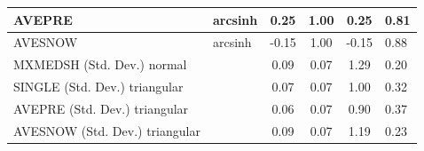 \begin{table}
\begin{center}
\begin{tabular}{|l|l|c|c|c|l|}
			\hline
			AVEPRE & arcsinh & 0.25 & 1.00 & 0.25 & 0.81 \\
			\hline
			AVESNOW & arcsinh & -0.15 & 1.00 & -0.15 & 0.88 \\
			\hline
			MXMEDSH (Std. Dev.) normal &  & 0.09 & 0.07 & 1.29 & 0.20 \\
			\hline
			SINGLE (Std. Dev.) triangular &  & 0.07 & 0.07 & 1.00 & 0.32 \\
			\hline
			AVEPRE (Std. Dev.) triangular &  & 0.06 & 0.07 & 0.90 & 0.37 \\
			\hline
			AVESNOW (Std. Dev.) triangular &  & 0.09 & 0.07 & 1.19 & 0.23 \\
			\hline
		\end{tabular}
	\end{center}
\end{table}